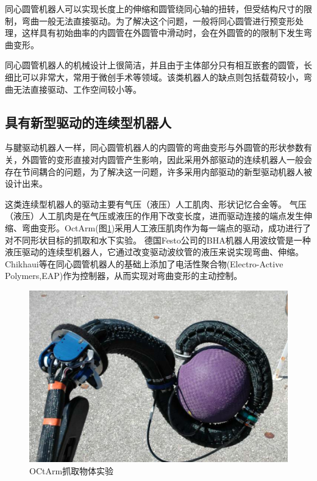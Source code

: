 同心圆管机器人可以实现长度上的伸缩和圆管绕同心轴的扭转，但受结构尺寸的限制，弯曲一般无法直接驱动。为了解决这个问题，一般将同心圆管进行预变形处理，这样具有初始曲率的内圆管在外圆管中滑动时，会在外圆管的的限制下发生弯曲变形\cite{sears_steerable_2006,webster_toward_2006,bergeles_concentric_2015,butler_robotic_2012}。

同心圆管机器人的机械设计上很简洁，并且由于主体部分只有相互嵌套的圆管，长细比可以非常大，常用于微创手术\cite{hendrick_hand-held_2015}等领域。该类机器人的缺点则包括载荷较小，弯曲无法直接驱动、工作空间较小等。
\subsection{具有新型驱动的连续型机器人}
与腱驱动机器人一样，同心圆管机器人的内圆管的弯曲变形与外圆管的形状参数有关，外圆管的变形直接对内圆管产生影响，因此采用外部驱动的连续机器人一般会存在节间耦合的问题，为了解决这一问题，许多采用内部驱动的新型驱动机器人被设计出来。
 
这类连续型机器人的驱动主要有气压（液压）人工肌肉、形状记忆合金\cite{ayvali_towards_2012-1}等。
气压（液压）人工肌肉是在气压或液压的作用下改变长度，进而驱动连接的端点发生伸缩、弯曲变形\cite{pritts_design_2004,guglielmino_octopus_2010}。OctArm(图\ref{fig:octarm})采用人工液压肌肉作为每一端点的驱动，成功进行了对不同形状目标的抓取和水下实验\cite{mcmahan_field_2006,trivedi_geometrically_2008}。
德国Festo公司的BHA机器人用波纹管是一种液压驱动的连续型机器人，它通过改变驱动波纹管的液压来说实现弯曲、伸缩\cite{falkenhahn_dynamic_2017}。Chikhaui等在同心圆管机器人的基础上添加了电活性聚合物(Electro-Active Polymers,EAP)作为控制器，从而实现对弯曲变形的主动控制\cite{chikhaoui_kinematics_2016}。
\begin{figure}[!htbp]
	\centering
	\includegraphics[width=.75\textwidth]{figures/octarm.png}
	\caption{OCtArm抓取物体实验\cite{mcmahan_field_2006}}
	\label{fig:octarm}
\end{figure}

